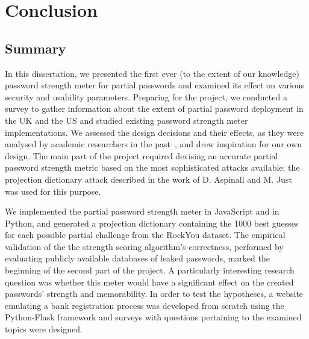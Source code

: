 
\chapter{Conclusion}
\label{cha:conclusion}

  \section{Summary}
    \label{sec:summary}
    In this dissertation, we presented the first ever (to the extent of our knowledge) password strength meter for partial passwords and examined its effect on various security and usability parameters. Preparing for the project, we conducted a survey to gather information about the extent of partial password deployment in the UK and the US and studied existing password strength meter implementations. We assessed the design decisions and their effects, as they were analysed by academic researchers in the past~\cite{strength_meter_effect,strength_meter_impact}, and drew inspiration for our own design. The main part of the project required devising an accurate partial password strength metric based on the most sophisticated attacks available; the projection dictionary attack described in the work of D. Aspinall and M. Just~\cite{part_pass} was used for this purpose.

    We implemented the partial password strength meter in JavaScript and in Python, and generated a projection dictionary containing the 1000 best guesses for each possible partial challenge from the RockYou dataset. The empirical validation of the the strength scoring algorithm's correctness, performed by evaluating publicly available databases of leaked passwords, marked the beginning of the second part of the project. A particularly interesting research question was whether this meter would have a significant effect on the created passwords' strength and memorability. In order to test the hypotheses, a website emulating a bank registration process was developed from scratch using the Python-Flask framework and surveys with questions pertaining to the examined topics were designed.


